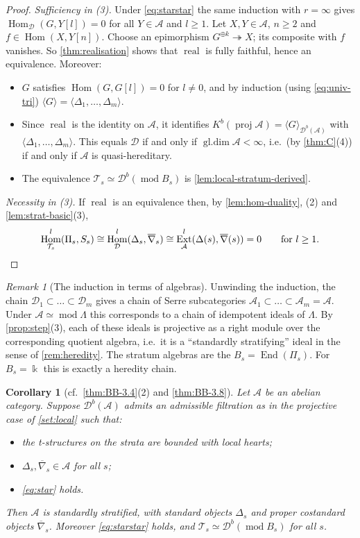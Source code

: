 \documentclass[11pt,reqno]{amsart}
\theoremstyle{plain}
\newtheorem{corollary}[theorem]{Corollary}
\theoremstyle{definition}
\theoremstyle{remark}
\newtheorem{remark}[theorem]{Remark}
\newcommand{\kk}{\Bbbk}
\DeclareMathOperator{\Hom}{Hom}
\DeclareMathOperator{\End}{End}
\DeclareMathOperator{\Ext}{Ext}
\DeclareMathOperator{\real}{real}
\DeclareMathOperator{\gldim}{gl.dim}
\newcommand{\modd}{\operatorname{mod}}
\newcommand{\proj}{\operatorname{proj}}
\newcommand{\Db}{\mathcal{D}^b}
\newcommand{\Kb}{K^b}
\newcommand{\thick}[1]{\langle #1\rangle}
\newcommand{\nablabar}{\overline{\nabla}}
\newcommand{\cD}{\mathcal{D}}
\newcommand{\cA}{\mathcal{A}}
\newcommand{\cT}{\mathcal{T}}
\begin{document}
\begin{proof}
\emph{Sufficiency in (3).} Under \eqref{eq:starstar} the same induction with $r=\infty$ gives $\Hom_\cD(G,Y[l])=0$ for all $Y\in\cA$ and $l\ge1$. Let $X,Y\in\cA$, $n\ge2$ and $f\in\Hom(X,Y[n])$. Choose an epimorphism $G^{\oplus k}\twoheadrightarrow X$; its composite with $f$ vanishes. So \cref{thm:realisation} shows that $\real$ is fully faithful, hence an equivalence. Moreover:
\begin{itemize}
\item $G$ satisfies $\Hom(G,G[l])=0$ for $l\ne0$, and by induction (using \eqref{eq:univ-tri}) $\thick G=\thick{\Delta_1,\dots,\Delta_m}$.
\item Since $\real$ is the identity on $\cA$, it identifies $\Kb(\proj\cA)=\thick G_{\Db(\cA)}$ with $\thick{\Delta_1,\dots,\Delta_m}$. This equals $\cD$ if and only if $\gldim\cA<\infty$, i.e.\ (by \cref{thm:C}(4)) if and only if $\cA$ is quasi-hereditary.
\item The equivalence $\cT_s\simeq\Db(\modd B_s)$ is \cref{lem:local-stratum-derived}.
\end{itemize}

\emph{Necessity in (3).} If $\real$ is an equivalence then, by \cref{lem:hom-duality}, (2) and \cref{lem:strat-basic}(3),
\[\Hom^l_{\cT_s}(\Pi_s,S_s)\cong\Hom^l_\cD(\Delta_s,\nablabar_s)\cong\Ext^l_\cA(\Delta(s),\nablabar(s))=0\qquad\text{for }l\ge1.\qedhere\]
\end{proof}

\begin{remark}[The induction in terms of algebras]
Unwinding the induction, the chain $\cD_1\subset\dots\subset\cD_m$ gives a chain of Serre subcategories $\cA_1\subset\dots\subset\cA_m=\cA$. Under $\cA\simeq\modd\Lambda$ this corresponds to a chain of idempotent ideals of $\Lambda$. By \cref{prop:step}(3), each of these ideals is projective as a right module over the corresponding quotient algebra, i.e.\ it is a ``standardly stratifying'' ideal in the sense of \cref{rem:heredity}. The stratum algebras are the $B_s=\End(\Pi_s)$. For $B_s=\kk$ this is exactly a heredity chain.
\end{remark}


\begin{corollary}[cf.\ {\cref{thm:BB-3.4}(2)} and {\cref{thm:BB-3.8}}]\label{cor:forward}
Let $\cA$ be an abelian category. Suppose $\Db(\cA)$ admits an admissible filtration as in the projective case of \cref{set:local} such that:
\begin{itemize}
\item the t-structures on the strata are bounded with local hearts;
\item $\Delta_s,\nablabar_s\in\cA$ for all $s$;
\item \eqref{eq:star} holds.
\end{itemize}
Then $\cA$ is standardly stratified, with standard objects $\Delta_s$ and proper costandard objects $\nablabar_s$. Moreover \eqref{eq:starstar} holds, and $\cT_s\simeq\Db(\modd B_s)$ for all $s$.
\end{corollary}
\end{document}
